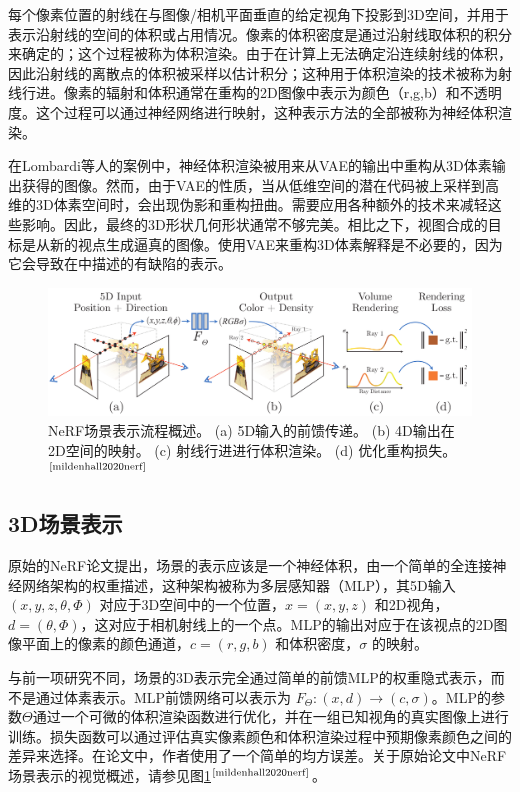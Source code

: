 \documentclass[UTF8,titlepage]{article}
\newcommand{\upcite}[1]{$^{\mbox{\scriptsize \cite{#1}}}$}
\numberwithin{figure}{section}
\begin{document}
每个像素位置的射线在与图像/相机平面垂直的给定视角下投影到3D空间，并用于表示沿射线的空间的体积或占用情况。像素的体积密度是通过沿射线取体积的积分来确定的；这个过程被称为体积渲染。由于在计算上无法确定沿连续射线的体积，因此沿射线的离散点的体积被采样以估计积分；这种用于体积渲染的技术被称为射线行进。像素的辐射和体积通常在重构的2D图像中表示为颜色（r,g,b）和不透明度。这个过程可以通过神经网络进行映射，这种表示方法的全部被称为神经体积渲染。

在Lombardi等人的案例中，神经体积渲染被用来从VAE的输出中重构从3D体素输出获得的图像。然而，由于VAE的性质，当从低维空间的潜在代码被上采样到高维的3D体素空间时，会出现伪影和重构扭曲。需要应用各种额外的技术来减轻这些影响。因此，最终的3D形状几何形状通常不够完美。相比之下，视图合成的目标是从新的视点生成逼真的图像。使用VAE来重构3D体素解释是不必要的，因为它会导致在\cite{Lombardi:2019}中描述的有缺陷的表示。

\begin{figure}[t]
  \normalsize
  
  \centerline{\includegraphics[scale=0.35]{fig.png}}
  \caption{NeRF场景表示流程概述。 (a) 5D输入的前馈传递。 (b) 4D输出在2D空间的映射。 (c) 射线行进进行体积渲染。 (d) 优化重构损失。 \upcite{mildenhall2020nerf}}
  \label{nerf}
\end{figure}

\subsection{3D场景表示}

原始的NeRF论文提出，场景的表示应该是一个神经体积，由一个简单的全连接神经网络架构的权重描述，这种架构被称为多层感知器（MLP），其5D输入 $(x,y,z,\theta, \Phi)$ 对应于3D空间中的一个位置，$x=(x,y,z)$ 和2D视角，$d=(\theta, \Phi)$，这对应于相机射线上的一个点。MLP的输出对应于在该视点的2D图像平面上的像素的颜色通道，$c=(r,g,b)$ 和体积密度，$\sigma$ 的映射。

与前一项研究不同，场景的3D表示完全通过简单的前馈MLP的权重隐式表示，而不是通过体素表示。MLP前馈网络可以表示为 $F_{\Theta}:(x,d) \rightarrow (c,\sigma)$。MLP的参数$\Theta$通过一个可微的体积渲染函数进行优化，并在一组已知视角的真实图像上进行训练。损失函数可以通过评估真实像素颜色和体积渲染过程中预期像素颜色之间的差异来选择。在论文中，作者使用了一个简单的均方误差。关于原始论文中NeRF场景表示的视觉概述，请参见图\ref{nerf}\upcite{mildenhall2020nerf}。
\end{document}
